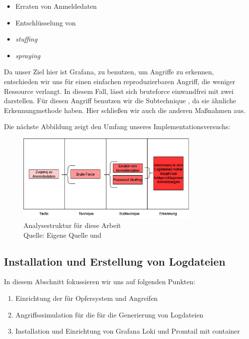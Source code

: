 {
\begin{itemize}[noitemsep]
   \item Erraten von Anmeldedaten 
   \item	Entschlüsselung von 
   \item \textit{\gls{stuffing}}
   \item \textit{\gls{spraying}}
\end{itemize}
}

Da unser Ziel hier ist Grafana, zu benutzen, um Angriffe zu erkennen, entschieden wir uns für einen einfachen reproduzierbaren Angriff, die weniger Ressource verlangt. In diesem Fall, lässt sich \gls{bruteforce} einwandfrei mit zwei  darstellen. Für diesen Angriff benutzen wir die Subtechnique , da sie ähnliche Erkennungmethode haben. Hier schließen wir auch die anderen Maßnahmen aus.

Die nächste Abbildung zeigt den Umfang unseres Implementationsversuchs:
\begin{figure}[H]
   \centering
   \includegraphics[width=0.8\textwidth]{assets/T1110.drawio.png}
   \caption{Analysestruktur für diese Arbeit  \\Quelle: Eigene Quelle und \citep{Mitre_t1110}}
   \centering
\end{figure}

\subsection{Installation und Erstellung von Logdateien}
In diesem Abschnitt fokussieren wir uns auf folgenden Punkten:

\begin{enumerate}[noitemsep]
   \item	Einrichtung der  für Opfersystem und Angreifen
   \item	Angriffsssimulation für die für die Generierung von Logdateien
   \item Installation und Einrichtung von Grafana Loki und Promtail mit \gls{container}
\end{enumerate}

